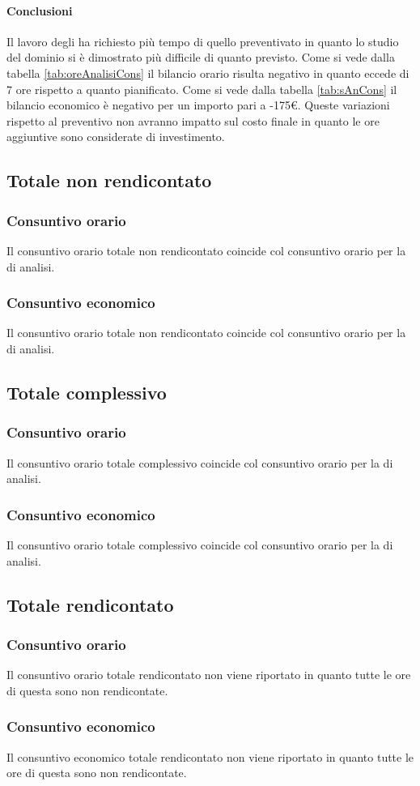 			\paragraph{Conclusioni}
			Il lavoro degli \analisti{} ha richiesto più tempo di quello preventivato in quanto lo studio del dominio si è dimostrato più difficile di quanto previsto. Come si vede dalla tabella \ref{tab:oreAnalisiCons} il bilancio orario risulta negativo in quanto eccede di 7 ore rispetto a quanto pianificato.
			Come si vede dalla tabella \ref{tab:sAnCons} il bilancio economico è negativo per un importo pari a -175€.
			Queste variazioni rispetto al preventivo non avranno impatto sul costo finale in quanto le ore aggiuntive sono considerate di investimento.

	\subsection{Totale non rendicontato}
		\subsubsection{Consuntivo orario}
		Il consuntivo orario totale non rendicontato coincide col consuntivo orario per la  di analisi.
		\subsubsection{Consuntivo economico}
		Il consuntivo orario totale non rendicontato coincide col consuntivo orario per la  di analisi.
	\subsection{Totale complessivo}
		\subsubsection{Consuntivo orario}
        Il consuntivo orario totale complessivo coincide col consuntivo orario per la  di analisi.
		\subsubsection{Consuntivo economico}
		Il consuntivo orario totale complessivo coincide col consuntivo orario per la  di analisi.
	\subsection{Totale rendicontato}
		\subsubsection{Consuntivo orario}
		Il consuntivo orario totale rendicontato non viene riportato in quanto tutte le ore di questa  sono non rendicontate.
		\subsubsection{Consuntivo economico}
		Il consuntivo economico totale rendicontato non viene riportato in quanto tutte le ore di questa  sono non rendicontate.

